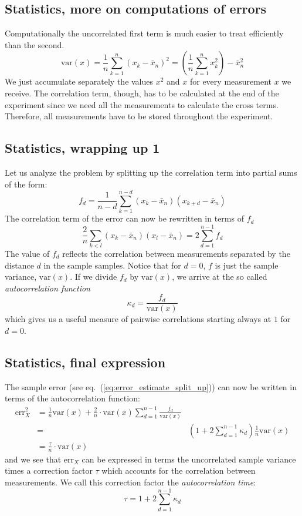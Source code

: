 \documentclass[%
oneside,                 %
final,                   %
10pt]{article}
\begin{document}
\subsection{Statistics, more on computations of errors}
\begin{block}{}
Computationally the uncorrelated first term is much easier to treat
efficiently than the second.
\[
\mathrm{var}(x) = \frac{1}{n}\sum_{k=1}^n (x_k - \bar x_n)^2 =
\left(\frac{1}{n}\sum_{k=1}^n x_k^2\right) - \bar x_n^2
\]
We just accumulate separately the values $x^2$ and $x$ for every
measurement $x$ we receive. The correlation term, though, has to be
calculated at the end of the experiment since we need all the
measurements to calculate the cross terms. Therefore, all measurements
have to be stored throughout the experiment.
\end{block}

\subsection{Statistics, wrapping up 1}
\begin{block}{}
Let us analyze the problem by splitting up the correlation term into
partial sums of the form:
\[
f_d = \frac{1}{n-d}\sum_{k=1}^{n-d}(x_k - \bar x_n)(x_{k+d} - \bar x_n)
\]
The correlation term of the error can now be rewritten in terms of
$f_d$
\[
\frac{2}{n}\sum_{k<l} (x_k - \bar x_n)(x_l - \bar x_n) =
2\sum_{d=1}^{n-1} f_d
\]
The value of $f_d$ reflects the correlation between measurements
separated by the distance $d$ in the sample samples.  Notice that for
$d=0$, $f$ is just the sample variance, $\mathrm{var}(x)$. If we divide $f_d$
by $\mathrm{var}(x)$, we arrive at the so called \emph{autocorrelation function}
\[
\kappa_d = \frac{f_d}{\mathrm{var}(x)}
\]
which gives us a useful measure of pairwise correlations
starting always at $1$ for $d=0$.
\end{block}

\subsection{Statistics, final expression}
\begin{block}{}
The sample error (see eq.~(\ref{eq:error_estimate_split_up})) can now be
written in terms of the autocorrelation function:
\begin{align}
\mathrm{err}_X^2 &=
\frac{1}{n}\mathrm{var}(x)+\frac{2}{n}\cdot\mathrm{var}(x)\sum_{d=1}^{n-1}
\frac{f_d}{\mathrm{var}(x)}\nonumber\\ &=&
\left(1+2\sum_{d=1}^{n-1}\kappa_d\right)\frac{1}{n}\mathrm{var}(x)\nonumber\\
&=\frac{\tau}{n}\cdot\mathrm{var}(x)
\label{eq:error_estimate_corr_time}
\end{align}
and we see that $\mathrm{err}_X$ can be expressed in terms the
uncorrelated sample variance times a correction factor $\tau$ which
accounts for the correlation between measurements. We call this
correction factor the \emph{autocorrelation time}:
\begin{equation}
\tau = 1+2\sum_{d=1}^{n-1}\kappa_d
\label{eq:autocorrelation_time}
\end{equation}
\end{block}
\end{document}

